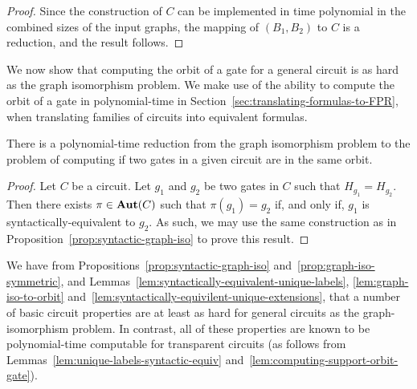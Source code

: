 \documentclass[../paper.tex]{subfiles}
\begin{document}
\begin{proof}






  Since the construction of $C$ can be implemented in time polynomial in the
  combined sizes of the input graphs, the mapping of $(B_1, B_2)$ to $C$ is a
  reduction, and the result follows.
\end{proof}

We now show that computing the orbit of a gate for a general circuit is as hard
as the graph isomorphism problem. We make use of the ability to compute the
orbit of a gate in polynomial-time in
Section~\ref{sec:translating-formulas-to-FPR}, when translating families of
circuits into equivalent formulas.

\begin{lem}
  There is a polynomial-time reduction from the graph isomorphism problem to the
  problem of computing if two gates in a given circuit are in the same orbit.
  \label{lem:graph-iso-to-orbit}
\end{lem}
\begin{proof}
  Let $C$ be a circuit. Let $g_1$ and $g_2$ be two gates in $C$ such that
  $H_{g_1} = H_{g_2}$. Then there exists $\pi \in \text{\textbf{Aut}}(C)$ such that $\pi (g_1)
  = g_2$ if, and only if, $g_1$ is syntactically-equivalent to $g_2$. As such,
  we may use the same construction as in
  Proposition~\ref{prop:syntactic-graph-iso} to prove this result.
\end{proof}
We have from Propositions~\ref{prop:syntactic-graph-iso}
and~\ref{prop:graph-iso-symmetric}, and
Lemmas~\ref{lem:syntactically-equivalent-unique-labels},
\ref{lem:graph-iso-to-orbit}
and~\ref{lem:syntactically-equivilent-unique-extensions}, that a number of basic
circuit properties are at least as hard for general circuits as the
graph-isomorphism problem. In contrast, all of these properties are known to be
polynomial-time computable for transparent circuits (as follows from
Lemmas~\ref{lem:unique-labels-syntactic-equiv}
and~\ref{lem:computing-support-orbit-gate}).
\end{document}
